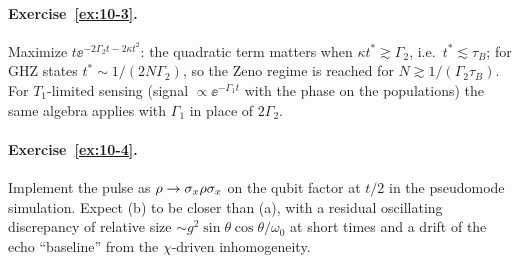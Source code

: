 \paragraph{Exercise~\ref{ex:10-3}.}
Maximize $t\ee^{-2\Gamma_2t-2\kappa t^2}$: the quadratic term matters when $\kappa t^*\gtrsim\Gamma_2$, i.e.\ $t^*\lesssim\tau_B$; for GHZ states $t^*\sim1/(2N\Gamma_2)$, so the Zeno regime is reached for $N\gtrsim1/(\Gamma_2\tau_B)$.
For $T_1$-limited sensing (signal $\propto\ee^{-\Gamma_1t}$ with the phase on the populations) the same algebra applies with $\Gamma_1$ in place of $2\Gamma_2$.

\paragraph{Exercise~\ref{ex:10-4}.}
Implement the pulse as $\rho\to\sigma_x\rho\sigma_x$ on the qubit factor at $t/2$ in the pseudomode simulation.
Expect (b) to be closer than (a), with a residual oscillating discrepancy of relative size $\sim g^2\sin\theta\cos\theta/\omega_0$ at short times and a drift of the echo ``baseline'' from the $\chi$-driven inhomogeneity.
